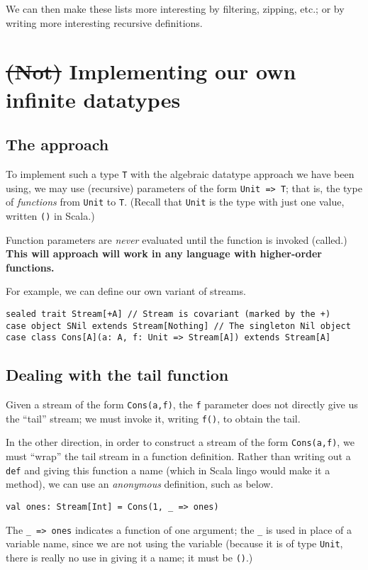 \documentclass[11pt]{article}
\begin{document}
We can then make these lists more interesting
by filtering, zipping, etc.;
or by writing more interesting recursive definitions.

\section{\sout{(Not)} Implementing our own infinite datatypes}
\label{sec:orgd958a98}
\subsection{The approach}
\label{sec:org75ac327}
To implement such a type \texttt{T} with the algebraic datatype approach
we have been using, we may use (recursive) parameters
of the form \texttt{Unit => T}; that is,
the type of \emph{functions} from \texttt{Unit} to \texttt{T}.
(Recall that \texttt{Unit} is the type with just one value,
written \texttt{()} in Scala.)

Function parameters are \emph{never} evaluated until
the function is invoked (called.)
\textbf{This will approach will work in any language with
higher-order functions.}

For example, we can define our own variant of streams.
\begin{verbatim}
sealed trait Stream[+A] // Stream is covariant (marked by the +)
case object SNil extends Stream[Nothing] // The singleton Nil object
case class Cons[A](a: A, f: Unit => Stream[A]) extends Stream[A]
\end{verbatim}

\subsection{Dealing with the tail function}
\label{sec:orge8a4f47}
Given a stream of the form \texttt{Cons(a,f)},
the \texttt{f} parameter does not directly give us the “tail” stream;
we must invoke it, writing \texttt{f()}, to obtain the tail.

In the other direction,
in order to construct a stream of the form \texttt{Cons(a,f)},
we must “wrap” the tail stream in a function definition.
Rather than writing out a \texttt{def} and giving this function a name
(which in Scala lingo would make it a method),
we can use an \emph{anonymous} definition,
such as below.
\begin{verbatim}
val ones: Stream[Int] = Cons(1, _ => ones)
\end{verbatim}
The \texttt{\_ => ones} indicates a function of one argument;
the \texttt{\_} is used in place of a variable name,
since we are not using the variable
(because it is of type \texttt{Unit}, there is really no use in
giving it a name; it must be \texttt{()}.)
\end{document}
